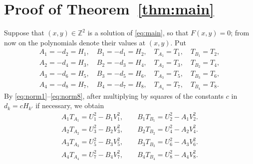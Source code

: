 \documentclass[11pt]{article}
\newcommand{\Z}{\mathbb{Z}}
\begin{document}
\section{Proof of Theorem~\ref{thm:main}}

Suppose that $(x,y)\in\Z^2$ is a solution of \eqref{eq:main}, so that $F(x,y)=0$; from now on the polynomials denote their values at $(x,y)$. Put
\begin{gather*}
A_{1}=-d_{2}=H_{1},\quad B_{1}=-d_{1}=H_{2},\quad T_{A_{1}}=T_{1},\quad T_{B_{1}}=T_{2},\\
A_{2}=-d_{4}=H_{3},\quad B_{2}=-d_{3}=H_{4},\quad T_{A_{2}}=T_{3},\quad T_{B_{2}}=T_{4},\\
A_{3}=-d_{6}=H_{5},\quad B_{3}=-d_{5}=H_{6},\quad T_{A_{3}}=T_{5},\quad T_{B_{3}}=T_{6},\\
A_{4}=-d_{8}=H_{7},\quad B_{4}=-d_{7}=H_{8},\quad T_{A_{4}}=T_{7},\quad T_{B_{4}}=T_{8}.
\end{gather*}
By \eqref{eq:norm1}--\eqref{eq:norm8}, after multiplying by squares of the constants $c$ in $d_k=cH_{k'}$ if necessary, we obtain
\begin{align}
A_{1}T_{A_{1}}=U_{1}^2-B_{1}V_{1}^2,\qquad B_{1}T_{B_{1}}=U_{2}^2-A_{1}V_{2}^2.\label{eq:AB1}\\
A_{2}T_{A_{2}}=U_{3}^2-B_{2}V_{3}^2,\qquad B_{2}T_{B_{2}}=U_{4}^2-A_{2}V_{4}^2.\label{eq:AB2}\\
A_{3}T_{A_{3}}=U_{5}^2-B_{3}V_{5}^2,\qquad B_{3}T_{B_{3}}=U_{6}^2-A_{3}V_{6}^2.\label{eq:AB3}\\
A_{4}T_{A_{4}}=U_{7}^2-B_{4}V_{7}^2,\qquad B_{4}T_{B_{4}}=U_{8}^2-A_{4}V_{8}^2.\label{eq:AB4}
\end{align}
\end{document}
